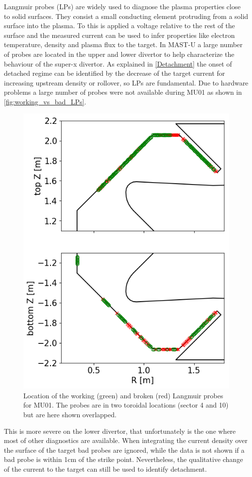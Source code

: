 Langmuir probes (LPs) are widely used to diagnose the plasma properties close to solid surfaces. They consist a small conducting element protruding from a solid surface into the plasma. To this is applied a voltage relative to the rest of the surface and the measured current can be used to infer properties like electron temperature, density and plasma flux to the target. \cite{Hutchinson2002} In MAST-U a large number of probes are located in the upper and lower divertor to help characterize the behaviour of the super-x divertor.\cite{Lovell2017} As explained in \autoref{Detachment} the onset of detached regime can be identified by the decrease of the target current for increasing upstream density or rollover, so LPs are fundamental. Due to hardware problems a large number of probes were not available during MU01 as shown in \autoref{fig:working_vs_bad_LPs}.

\begin{figure}
	\centering
	\includegraphics[trim={0 0 0 0},clip,width=0.5\linewidth]{Chapters/chapter2/figs/working_vs_bad_LPs.png}
	\caption{Location of the working (green) and broken (red) Langmuir probes for MU01. The probes are in two toroidal locations (sector 4 and 10) but are here shown overlapped.}
	\label{fig:working_vs_bad_LPs}
\end{figure}

This is more severe on the lower divertor, that unfortunately is the one where most of other diagnostics are available. When integrating the current density over the surface of the target bad probes are ignored, while the data is not shown if a bad probe is within 1cm of the strike point. Nevertheless, the qualitative change of the current to the target can still be used to identify detachment.

